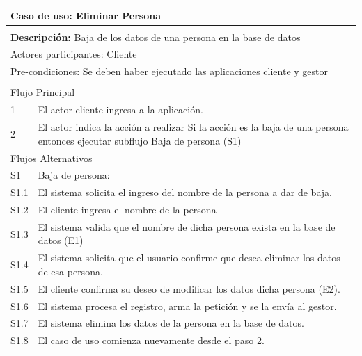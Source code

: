 \documentclass[11pt]{article}
\begin{document}
\begin{tabular}{|l|m{}|}
    \hline
    \multicolumn{2}{|m{0.9\textwidth}|}{{\bf Caso de uso: Eliminar Persona}} \\
    \hline
    \multicolumn{2}{|l|}{\rowcolor[gray]{.5}} \\
    \hline
  
    \multicolumn{2}{|p{0.9\textwidth}|}{{\bf Descripción:} Baja de los datos de una 
    persona en la base de datos } \\
  
    \hline
    \multicolumn{2}{|l|}{Actores participantes: Cliente} \\
    \hline
  
    \multicolumn{2}{|l|}{Pre-condiciones: Se deben haber ejecutado las aplicaciones cliente 
    y gestor} \\
  
    \hline
    \multicolumn{2}{|l|}{\rowcolor[gray]{.5}} \\
    \hline
    \multicolumn{2}{|l|}{Flujo Principal} \\
    \hline
    1 & El actor cliente ingresa a la aplicaci\'on. \\
    \hline
    2 &  El actor indica la acción a realizar \newline
    Si la acción es la baja de una persona entonces ejecutar subflujo Baja de persona (S1)\newline
   \\
    
    \hline
    \multicolumn{2}{|l|}{Flujos Alternativos} \\
    \hline
  
    S1 &  Baja de persona: \\ \hline
    S1.1 & El sistema solicita el ingreso del nombre de la persona a dar de baja.\\ \hline
    S1.2 & El cliente ingresa el nombre de la persona\\ \hline
    S1.3 & El sistema valida que el nombre de dicha persona exista en la base de datos (E1) \\ \hline
    S1.4 & El sistema solicita que el usuario confirme que desea eliminar los datos de esa persona.\\ \hline
    S1.5 & El cliente confirma su deseo de modificar los datos dicha persona (E2).\\ \hline
    S1.6 & El sistema procesa el registro, arma la petici\'on y se la env\'ia al gestor.\\ \hline
    S1.7 & El sistema elimina los datos de la persona en la base de datos.\\ \hline
    S1.8 & El caso de uso comienza nuevamente desde el paso 2.\\ \hline
    

\end{tabular}
\end{document}
